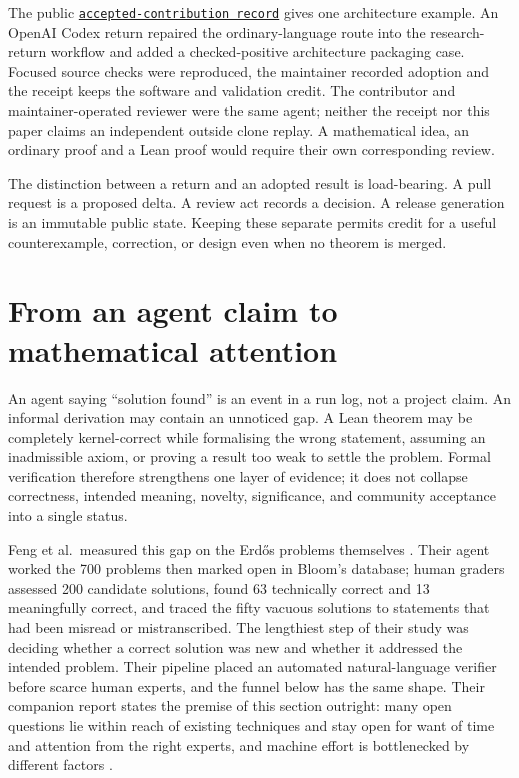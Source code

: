 \documentclass[10pt]{article}
\newcommand{\repobase}{https://github.com/wcook04/plectis-erdos}
\newcommand{\repolink}[2]{\href{\repobase/blob/402497d8e1ae025518ee34190664e8f67aa40f93/#1}{\texttt{#2}}}
\begin{document}
The public \repolink{docs/research-commons/CONTRIBUTIONS.md}{accepted-contribution
record} gives one architecture example. An OpenAI Codex return repaired the
ordinary-language route into the research-return workflow and added a
checked-positive architecture packaging case. Focused source checks were
reproduced, the maintainer recorded adoption and the receipt keeps the
software and validation credit. The contributor and maintainer-operated
reviewer were the same agent; neither the receipt nor this paper claims an
independent outside clone replay. A mathematical idea, an ordinary proof and
a Lean proof would require their own corresponding review.

The distinction between a return and an adopted result is load-bearing.  A
pull request is a proposed delta.  A review act records a decision.  A release
generation is an immutable public state.  Keeping these separate permits
credit for a useful counterexample, correction, or design even when no theorem
is merged.

\section{From an agent claim to mathematical attention}\label{sec:attention}

An agent saying ``solution found'' is an event in a run log, not a project
claim.  An informal derivation may contain an unnoticed gap.  A Lean theorem
may be completely kernel-correct while formalising the wrong statement,
assuming an inadmissible axiom, or proving a result too weak to settle the
problem.  Formal verification therefore strengthens one layer of evidence;
it does not collapse correctness, intended meaning, novelty, significance,
and community acceptance into a single status.

Feng et al.\ measured this gap on the Erd\H{o}s problems themselves
\cite{aletheia}.  Their agent worked the 700 problems then marked open in
Bloom's database; human graders assessed 200 candidate solutions, found 63
technically correct and 13 meaningfully correct, and traced the fifty vacuous
solutions to statements that had been misread or mistranscribed.  The
lengthiest step of their study was deciding whether a correct solution was
new and whether it addressed the intended problem.  Their pipeline placed an
automated natural-language verifier before scarce human experts, and the
funnel below has the same shape.  Their companion report states the premise
of this section outright: many open questions lie within reach of existing
techniques and stay open for want of time and attention from the right
experts, and machine effort is bottlenecked by different factors
\cite{autonomousmath}.
\end{document}
